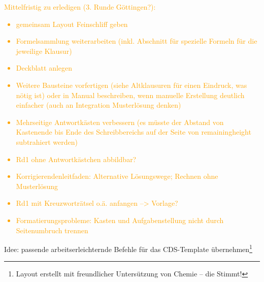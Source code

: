 \documentclass[./main.tex]{subfiles}
\begin{document}
\renewcommand{\tasktitle}{To-do-Liste}
\renewcommand{\taskpoints}{0}
\renewcommand{\taskweight}{0}
\aufgabenanfang
\textcolor{orange}{Mittelfristig zu erledigen (3. Runde G\"ottingen?): 
\begin{itemize}
    \item gemeinsam Layout Feinschliff geben
    \item Formelsammlung weiterarbeiten (inkl. Abschnitt f\"ur spezielle Formeln f\"ur die jeweilige Klausur)
    \item Deckblatt anlegen
    \item Weitere Bausteine vorfertigen (siehe Altklausuren f\"ur einen Eindruck, was n\"otig ist) oder in Manual beschreiben, wenn manuelle Erstellung deutlich einfacher (auch an Integration Musterl\"osung denken)
    \item Mehrseitige Antwortkästen verbessern (es müsste der Abstand von Kastenende bis Ende des Schreibbereichs auf der Seite von remainingheight subtrahiert werden)
    \item Rd1 ohne Antwortk\"astchen abbildbar?
    \item Korrigierendenleitfaden: Alternative L\"osungswege; Rechnen ohne Musterl\"osung
    \item Rd1 mit Kreuzwortr\"atsel o.\"a. anfangen --> Vorlage?
    \item Formatierungsprobleme: Kasten und Aufgabenstellung nicht durch Seitenumbruch trennen
\end{itemize}}
Idee: passende arbeitserleichternde Befehle f\"ur das CDS-Template \"ubernehmen\footnote{Layout erstellt mit freundlicher Unters\"utzung von \glqq{}Chemie -- die Stimmt!\grqq{}}
\aufgabenende
\end{document}
